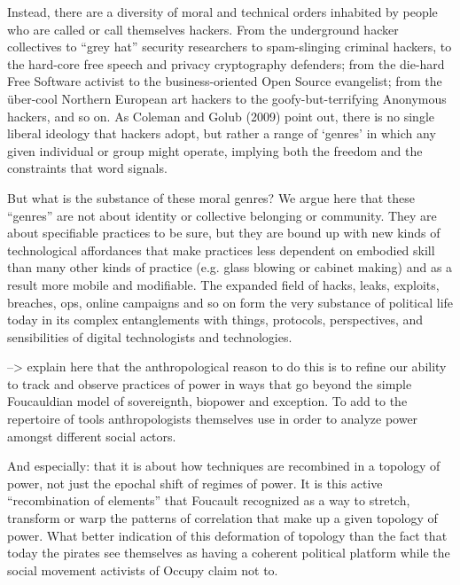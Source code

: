\documentclass[10pt,letter,oneside]{scrartcl}
\begin{document}
Instead, there are a diversity of moral and technical orders inhabited by
people who are called or call themselves hackers. From the underground hacker
collectives to ``grey hat'' security researchers to spam-slinging criminal
hackers, to the hard-core free speech and privacy cryptography defenders; from
the die-hard Free Software activist to the business-oriented Open Source
evangelist; from the über-cool Northern European art hackers to the
goofy-but-terrifying Anonymous hackers, and so on.  As Coleman and Golub (2009)
point out, there is no single liberal ideology that hackers adopt, but rather a
range of ‘genres’ in which any given individual or group might operate,
implying both the freedom and the constraints that word signals.

But what is the substance of these moral genres?  We argue here that these
``genres'' are not about identity or collective belonging or community.  They
are about specifiable practices to be sure, but they are bound up with new
kinds of technological affordances that make practices less dependent on
embodied skill than many other kinds of practice (e.g. glass blowing or cabinet
making) and as a result more mobile and modifiable.  The expanded field of
hacks, leaks, exploits, breaches, ops, online campaigns and so on form the very
substance of political life today in its complex entanglements with things,
protocols, perspectives, and sensibilities of digital technologists and
technologies.

--> explain here that the anthropological reason to do this is to refine our
ability to track and observe practices of power in ways that go beyond the
simple Foucauldian model of sovereignth, biopower and exception.  To add to the
repertoire of tools anthropologists themselves use in order to analyze power
amongst different social actors.  

{  And especially: that it is about how techniques are recombined in a topology
of power, not just the epochal shift of regimes of power.   It is this active
``recombination of elements'' that Foucault recognized as a way to stretch,
transform or warp the patterns of correlation that make up a given topology of
power. What better indication of this deformation of topology than the fact
that today the pirates see themselves as having a coherent political platform
while the social movement activists of Occupy claim not to.}
\end{document}
